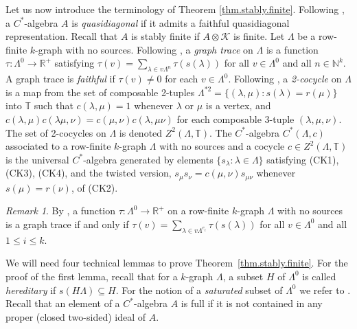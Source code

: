 \documentclass[a4paper, 12pt]{amsart}
\numberwithin{equation}{section}
\newcounter{theorem}
\theoremstyle{remark}
\newtheorem{remark}[theorem]{Remark}
\theoremstyle{definition}
\begin{document}
Let us now introduce the terminology of Theorem \ref{thm.stably.finite}. Following
\cite[p.~961]{MR3507995}, a $C^*$-algebra $A$ is \emph{quasidiagonal} if it admits a
faithful quasidiagonal representation. Recall that $A$ is stably finite if $A \otimes
{\mathcal{K}}$ is finite. Let $\Lambda$ be a row-finite $k$-graph with no sources. Following
\cite{MR2434188}, a \emph{graph trace} on $\Lambda$ is a function $\tau \colon
\Lambda^0\to {\mathbb{R}}^+$ satisfying $\tau(v)=\sum_{\lambda\in v\Lambda^n} \tau(s(\lambda))$
for all $v\in \Lambda^0$ and all $n\in {\mathbb{N}}^k$. A graph trace is \emph{faithful} if
$\tau(v)\neq 0$ for each $v\in \Lambda^0$. Following \cite{MR3311883}, a \emph{2-cocycle}
on $\Lambda$ is a map from the set of composable 2-tuples $\Lambda^{*2}=\{(\lambda,\mu) :
s(\lambda) = r(\mu)\}$ into ${\mathbb{T}}$ such that $c(\lambda, \mu) = 1$ whenever $\lambda$ or
$\mu$ is a vertex, and $c(\lambda, \mu)c(\lambda\mu, \nu) = c(\mu, \nu)c(\lambda,
\mu\nu)$ for each composable 3-tuple $(\lambda, \mu, \nu)$. The set of 2-cocycles on
$\Lambda$ is denoted $Z^2(\Lambda,{\mathbb{T}})$. The $C^*$-algebra $C^*(\Lambda,c)$ associated to
a row-finite $k$-graph $\Lambda$ with no sources and a cocycle $c\in Z^2(\Lambda,{\mathbb{T}})$ is
the universal $C^*$-algebra generated by elements $\{s_\lambda : \lambda \in \Lambda \}$
satisfying (CK1), (CK3), (CK4), and the twisted version, $s_\mu s_\nu = c(\mu,
\nu)s_{\mu\nu}$ whenever $s(\mu) = r(\nu)$, of (CK2).

\begin{remark}\label{easy.graphtrace}
By \cite[Lemma~A.5]{MR2434188}, a function $\tau \colon \Lambda^0\to {\mathbb{R}}^+$ on a
row-finite $k$-graph $\Lambda$ with no sources is a graph trace if and only if
$\tau(v)=\sum_{\lambda\in v\Lambda^{e_i}} \tau(s(\lambda))$ for all $v\in \Lambda^0$ and
all $1\leq i\leq k$.
\end{remark}

We will need four technical lemmas to prove Theorem~\ref{thm.stably.finite}. For the
proof of the first lemma, recall that for a $k$-graph $\Lambda$, a subset $H$ of
$\Lambda^0$ is called \emph{hereditary} if $s(H\Lambda)\subseteq H$. For the notion of a
\emph{saturated} subset of $\Lambda^0$ we refer to \cite{MR2323468}. Recall that an element of
a $C^*$-algebra $A$ is full if it is not contained in any proper (closed two-sided) ideal
of $A$.
\end{document}
